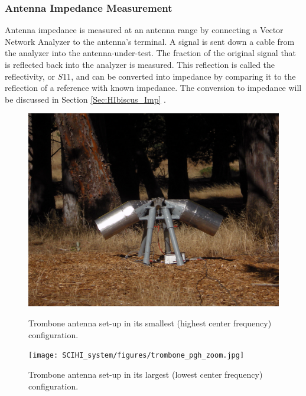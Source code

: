 \subsubsection{Antenna Impedance Measurement} 

Antenna impedance is measured at an antenna range by connecting a Vector Network Analyzer to the antenna's terminal. A signal is sent down a cable from the analyzer into the antenna-under-test. The fraction of the original signal that is reflected back into the analyzer is measured. This reflection is called the reflectivity, or $S11$, and can be converted into impedance by comparing it to the reflection of a reference with known impedance. The conversion to impedance will be discussed in Section \ref{Sec:HIbiscus_Imp} \cite{stutzman1981}.

\begin{figure}[htb]
\centering
\begin{minipage}[b]{0.45\textwidth}
\centering
\includegraphics[width=0.95\linewidth]{SCIHI_system/figures/trombone_guad_small.jpg}
\caption{Trombone antenna set-up in its smallest (highest center frequency) configuration. }
\label{Fig:trombone_small}
\end{minipage}%
\begin{minipage}[b]{0.02\textwidth}
\hspace{1cm}
\end{minipage}%
\begin{minipage}[b]{0.51\textwidth}
\centering
\texttt{[image: SCIHI\_system/figures/trombone\_pgh\_zoom.jpg]}
\caption{Trombone antenna set-up in its largest (lowest center frequency) configuration.}
\label{Fig:trombone_large}
\end{minipage}
\end{figure}


